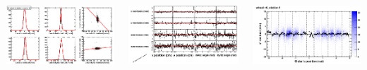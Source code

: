 \documentclass[compress]{beamer}
\begin{document}
\begin{frame}
\begin{columns}
\vspace{-1 cm}
\hfill \includegraphics[width=0.8\linewidth]{MBwhCst1sec10_bellcurves.png}

\includegraphics[width=\linewidth]{MBwhCst1sec10_polynomials.png}

\includegraphics[width=\linewidth]{DTvsphi_st1whC_x.png}


\end{columns}
\end{frame}
\end{document}
